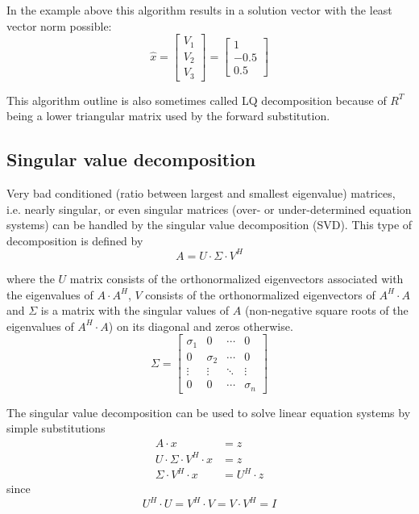In the example above this algorithm results in a solution vector with
the least vector norm possible:
\begin{equation}
\hat{x} =
\begin{bmatrix}
V_1\\
V_2\\
V_3
\end{bmatrix}
=
\begin{bmatrix}
1\\
-0.5\\
0.5
\end{bmatrix}
\end{equation}

This algorithm outline is also sometimes called LQ decomposition
because of $R^T$ being a lower triangular matrix used by the forward
substitution.

\subsection{Singular value decomposition}

Very bad conditioned (ratio between largest and smallest eigenvalue)
matrices, i.e. nearly singular, or even singular matrices (over- or
under-determined equation systems) can be handled by the singular
value decomposition (SVD).  This type of decomposition is defined by
\begin{equation}
\label{eq:USV}
A = U\cdot \Sigma\cdot V^H
\end{equation}

where the $U$ matrix consists of the orthonormalized eigenvectors
associated with the eigenvalues of $A\cdot A^H$, $V$ consists of the
orthonormalized eigenvectors of $A^H\cdot A$ and $\Sigma$ is a matrix
with the singular values of $A$ (non-negative square roots of the
eigenvalues of $A^H\cdot A$) on its diagonal and zeros otherwise.
\begin{equation}
\Sigma =
\begin{bmatrix}
\sigma_1 & 0 & \cdots & 0\\
0 & \sigma_2 & \cdots & 0\\
\vdots & \vdots & \ddots & \vdots\\
0 & 0 & \cdots & \sigma_n
\end{bmatrix}
\end{equation}

The singular value decomposition can be used to solve linear equation
systems by simple substitutions
\begin{align}
A\cdot x &= z\\
U\cdot \Sigma\cdot V^H\cdot x &= z\\
\Sigma\cdot V^H\cdot x &= U^H\cdot z
\end{align}
since
\begin{equation}
U^H\cdot U = V^H\cdot V = V\cdot V^H = I
\end{equation}

